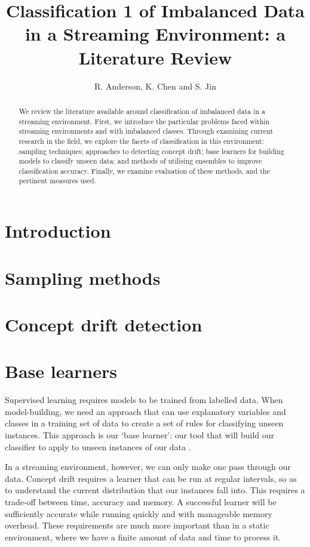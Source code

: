 \documentclass[10pt]{article}
\title{Classification 1 of Imbalanced Data in a Streaming Environment: a Literature Review}
\author{R. Anderson, K. Chen and S. Jin}
\begin{document}
\maketitle

\begin{abstract}
We review the literature available around classification of imbalanced data in a streaming environment. First, we introduce the particular problems faced within streaming environments and with imbalanced classes. Through examining current research in the field, we explore the facets of classification in this environment: sampling techniques; approaches to detecting concept drift; base learners for building models to classify unseen data; and methods of utilising ensembles to improve classification accuracy. Finally, we examine evaluation of these methods, and the pertinent measures used.
\end{abstract}

\section{Introduction}
\section{Sampling methods}
\section{Concept drift detection}
\section{Base learners}

Supervised learning requires models to be trained from labelled data. When model-building, we need an approach that can use explanatory variables and classes in a training set of data to create a set of rules for classifying unseen instances. This approach is our ‘base learner’: our tool that will build our classifier to apply to unseen instances of our data \cite{hoe12}.

In a streaming environment, however, we can only make one pass through our data. Concept drift requires a learner that can be run at regular intervals, so as to understand the current distribution that our instances fall into. This requires a trade-off between time, accuracy and memory. A successful learner will be sufficiently accurate while running quickly and with manageable memory overhead. These requirements are much more important than in a static environment, where we have a finite amount of data and time to process it.
\end{document}
